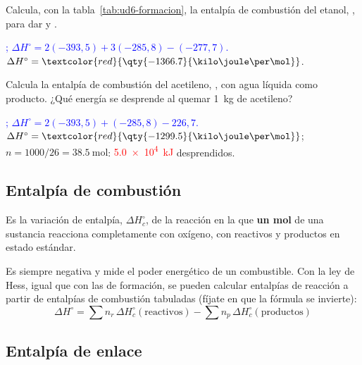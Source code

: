 \begin{exercise}
    Calcula, con la tabla~\ref{tab:ud6-formacion}, la entalpía de combustión del etanol, , para dar  y
    .
    \begin{solu}
        \textcolor{blue}{; \(\Delta H^\circ = 2(-393{,}5) + 3(-285{,}8) - (-277{,}7)\).}
        \(\Delta H^\circ = \textcolor{red}{\qty{-1366.7}{\kilo\joule\per\mol}}\).
    \end{solu}
\end{exercise}

\begin{exercise}
    Calcula la entalpía de combustión del acetileno, , con agua líquida como producto. ¿Qué energía se desprende al
    quemar \qty{1}{\kilo\gram} de acetileno?
    \begin{solu}
        \textcolor{blue}{; \(\Delta H^\circ = 2(-393{,}5) + (-285{,}8) - 226{,}7\).}
        \(\Delta H^\circ = \textcolor{red}{\qty{-1299.5}{\kilo\joule\per\mol}}\); \(n = 1000/26 = \qty{38.5}{\mol}\):
        \textcolor{red}{\qty{5.0e4}{\kilo\joule}} desprendidos.
    \end{solu}
\end{exercise}

\subsection{Entalpía de combustión}

\begin{definition}
    Es la variación de entalpía, \(\Delta H_c^\circ\), de la reacción en la que \textbf{un mol} de una sustancia reacciona
    completamente con oxígeno, con reactivos y productos en estado estándar.
\end{definition}

Es siempre negativa y mide el poder energético de un combustible. Con la ley de Hess, igual que con las de formación, se pueden
calcular entalpías de reacción a partir de entalpías de combustión tabuladas (fíjate en que la fórmula se invierte):
\[ \Delta H^\circ = \sum n_r\, \Delta H_c^\circ(\text{reactivos}) - \sum n_p\, \Delta H_c^\circ(\text{productos}) \]

\subsection{Entalpía de enlace}

